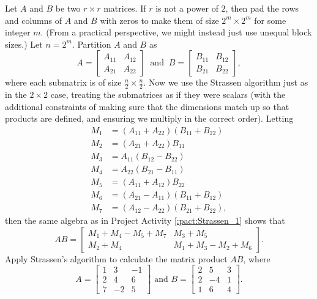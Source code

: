 \begin{pactivity} Let $A$ and $B$ be two $r \times r$ matrices.  If $r$ is not a power of $2$, then pad the rows and columns of $A$ and $B$ with zeros to make them of size $2^m \times 2^m$ for some integer $m$. (From a practical perspective, we might instead just use unequal block sizes.) Let $n = 2^m$.  Partition $A$ and $B$ as 
\[A = \left[ \begin{array}{cc} A_{11}&A_{12}\\A_{21}&A_{22} \end{array} \right] \ \text{ and } \  B = \left[ \begin{array}{cc} B_{11}&B_{12}\\B_{21}&B_{22} \end{array} \right],\]
where each submatrix is of size $\frac{n}{2} \times \frac{n}{2}$. Now we use the Strassen algorithm just as in the $2 \times 2$ case, treating the submatrices as if they were scalars (with the additional constraints of making sure that the dimensions match up so that products are defined, and ensuring we multiply in the correct order). Letting
\begin{align*}
M_1 &= (A_{11}+A_{22})(B_{11}+B_{22}) \\
M_2 &= (A_{21}+A_{22})B_{11} \\
M_3 &= A_{11}(B_{12}-B_{22}) \\
M_4 &= A_{22}(B_{21}-B_{11}) \\
M_5 &= (A_{11}+A_{12})B_{22} \\
M_6 &=(A_{21}-A_{11})(B_{11}+B_{12}) \\
M_7 &= (A_{12}-A_{22})(B_{21}+B_{22}),
\end{align*}
then the same algebra as in Project Activity \ref{:pact:Strassen_1} shows that 
\[AB = \left[ \begin{array}{cc} M_1+M_4-M_5+M_7 & M_3+M_5 \\ M_2+M_4 & M_1+M_3-M_2+M_6 \end{array} \right].\]	
Apply Strassen's algorithm to calculate the matrix product $AB$, where 
\[A = \left[ \begin{array}{crr} 1&3&-1\\2&4&6\\7&-2&5 \end{array} \right] \text{ and } B = \left[ \begin{array}{crc} 2&5&3\\2&-4&1\\1&6&4 \end{array} \right].\]


\end{pactivity}

